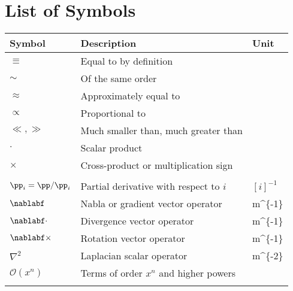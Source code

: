 \chapter*{List of Symbols}




\begin{center}
\thicklines
\begin{tabular}{p{2cm}p{8cm}p{3cm}}
Symbol                    	& Description									& Unit \\ \hline\hline
$\equiv$       				& Equal to by definition						& \SI{}{} \\
$\sim$       				& Of the same order								& \SI{}{} \\
$\approx$       			& Approximately equal to						& \SI{}{} \\
$\propto$       			& Proportional to								& \SI{}{} \\
$\ll,\gg$       			& Much smaller than, much greater than			& \SI{}{} \\
$\cdot$       				& Scalar product								& \SI{}{} \\
$\times$       				& Cross-product or multiplication sign			& \SI{}{} \\\\

$\pp_i=\pp/\pp_i$           & Partial derivative with respect to $i$		& $[i]^{-1}$ \\
$\nablabf$                	& Nabla or gradient vector operator				& \SI{m^{-1}}{} \\
$\nablabf\cdot$           	& Divergence vector operator			  		& \SI{m^{-1}}{} \\
$\nablabf\times$          	& Rotation vector operator						& \SI{m^{-1}}{} \\
$\nabla^2$                	& Laplacian scalar operator						& \SI{m^{-2}}{} \\
$\mathcal{O}(x^n)$          & Terms of order $x^n$ and higher powers		& \SI{}{} \\\\


\end{tabular}
\end{center}

